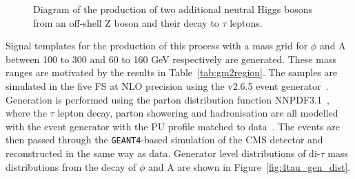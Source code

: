 \begin{figure}[!hbtp]
\centering
{}
\vspace*{10mm}
\caption[Diagram of the production of two additional neutral Higgs bosons from an off-shell Z boson and their decay to $\tau$ leptons.]{Diagram of the production of two additional neutral Higgs bosons from an off-shell Z boson and their decay to $\tau$ leptons.}
\label{fig:4tau_feynamn}
\end{figure}

Signal templates for the production of this process with a mass grid for $\phi$ and A between 100 to 300 and 60 to 160 GeV respectively are generated.
These mass ranges are motivated by the results in Table~\ref{tab:gm2region}.
The samples are simulated in the five \ac{FS} at \ac{NLO} precision using the \MGvATNLO v2.6.5 event generator~\cite{Alwall:2011uj}.
Generation is performed using the parton distribution function NNPDF3.1~\cite{Ball:2014uwa,Ball:2017nwa}, where the $\tau$ lepton decay, parton showering and hadronisation are all modelled with the \PYTHIA event generator with the \ac{PU} profile matched to data~\cite{Sirunyan:2019dfx,Sjostrand:2014zea}.
The events are then passed through the \texttt{GEANT4}-based \cite{Agostinelli:2002hh} simulation of the \ac{CMS} detector and reconstructed in the same way as data.
Generator level distributions of di-$\tau$ mass distributions from the decay of $\phi$ and A are shown in Figure~\ref{fig:4tau_gen_dist}.\\

